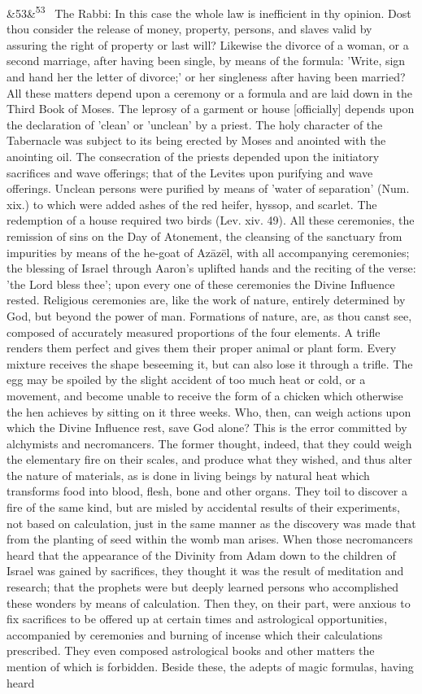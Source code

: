 \documentclass[12pt]{article}
\newcommand{\para}[1][]{\par\noindent\ifx&#1&\else\textsuperscript{\footnotesize #1}~\fi}
\begin{document}
\para[53] The Rabbi: In this case the whole law is inefficient in thy opinion. Dost thou consider the release of money, property, persons, and slaves valid by assuring the right of property or last will? Likewise the divorce of a woman, or a second marriage, after having been single, by means of the formula: 'Write, sign and hand her the letter of divorce;' or her singleness after having been married? All these matters depend upon a ceremony or a formula and are laid down in the Third Book of Moses. The leprosy of a garment or house [officially] depends upon the declaration of 'clean' or 'unclean' by a priest. The holy character of the Tabernacle was subject to its being erected by Moses and anointed with the anointing oil. The consecration of the priests depended upon the initiatory sacrifices and wave offerings; that of the Levites upon purifying and wave offerings. Unclean persons were purified by means of 'water of separation' (Num. xix.) to which were added ashes of the red heifer, hyssop, and scarlet. The redemption of a house required two birds (Lev. xiv. 49). All these ceremonies, the remission of sins on the Day of Atonement, the cleansing of the sanctuary from impurities by means of the he-goat of Azāzēl, with all accompanying ceremonies; the blessing of Israel through Aaron's uplifted hands and the reciting of the verse: 'the Lord bless thee'; upon every one of these ceremonies the Divine Influence rested. Religious ceremonies are, like the work of nature, entirely determined by God, but beyond the power of man. Formations of nature, are, as thou canst see, composed of accurately measured proportions of the four elements. A trifle renders them perfect and gives them their proper animal or plant form. Every mixture receives the shape beseeming it, but can also lose it through a trifle. The egg may be spoiled by the slight accident of too much heat or cold, or a movement, and become unable to receive the form of a chicken which otherwise the hen achieves by sitting on it three weeks. Who, then, can weigh actions upon which the Divine Influence rest, save God alone? This is the error committed by alchymists and necromancers. The former thought, indeed, that they could weigh the elementary fire on their scales, and produce what they wished, and thus alter the nature of materials, as is done in living beings by natural heat which transforms food into blood, flesh, bone and other organs. They toil to discover a fire of the same kind, but are misled by accidental results of their experiments, not based on calculation, just in the same manner as the discovery was made that from the planting of seed within the womb man arises. When those necromancers heard that the appearance of the Divinity from Adam down to the children of Israel was gained by sacrifices, they thought it was the result of meditation and research; that the prophets were but deeply learned persons who accomplished these wonders by means of calculation. Then they, on their part, were anxious to fix sacrifices to be offered up at certain times and astrological opportunities, accompanied by ceremonies and burning of incense which their calculations prescribed. They even composed astrological books and other matters the mention of which is forbidden. Beside these, the adepts of magic formulas, having heard 
\end{document}
